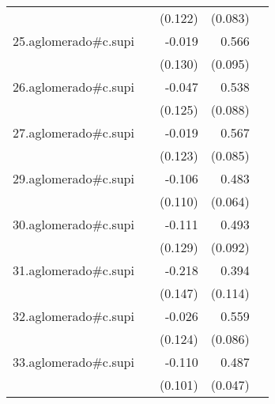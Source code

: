 {\begin{longtable}{l*{4}{D{.}{.}{-1}}}
            &                     &     (0.122)         &     (0.083)         &                     \\
\addlinespace
25.aglomerado#c.supi&                     &      -0.019         &       0.566\sym{***}&                     \\
            &                     &     (0.130)         &     (0.095)         &                     \\
\addlinespace
26.aglomerado#c.supi&                     &      -0.047         &       0.538\sym{***}&                     \\
            &                     &     (0.125)         &     (0.088)         &                     \\
\addlinespace
27.aglomerado#c.supi&                     &      -0.019         &       0.567\sym{***}&                     \\
            &                     &     (0.123)         &     (0.085)         &                     \\
\addlinespace
29.aglomerado#c.supi&                     &      -0.106         &       0.483\sym{***}&                     \\
            &                     &     (0.110)         &     (0.064)         &                     \\
\addlinespace
30.aglomerado#c.supi&                     &      -0.111         &       0.493\sym{***}&                     \\
            &                     &     (0.129)         &     (0.092)         &                     \\
\addlinespace
31.aglomerado#c.supi&                     &      -0.218         &       0.394\sym{***}&                     \\
            &                     &     (0.147)         &     (0.114)         &                     \\
\addlinespace
32.aglomerado#c.supi&                     &      -0.026         &       0.559\sym{***}&                     \\
            &                     &     (0.124)         &     (0.086)         &                     \\
\addlinespace
33.aglomerado#c.supi&                     &      -0.110         &       0.487\sym{***}&                     \\
            &                     &     (0.101)         &     (0.047)         &                     \\

\end{longtable}}
